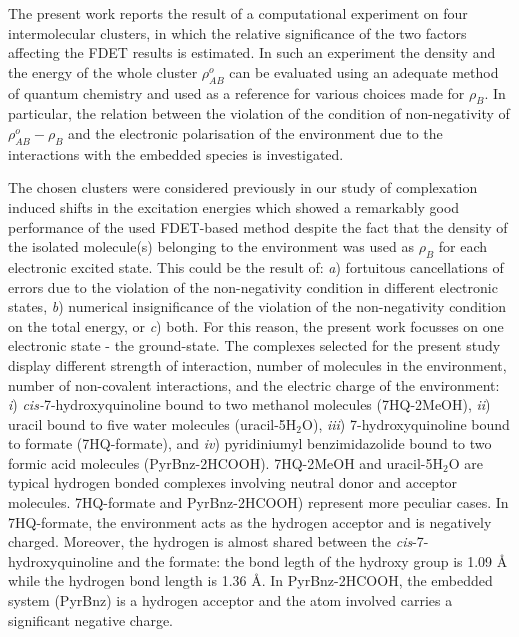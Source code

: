 \documentclass[journal=jctcce,manuscript=article]{achemso}
\newcommand{\nr}[1]{\color{red}#1\color{black}}
\begin{document}
The present work reports the result of a computational experiment on four intermolecular clusters, in which the relative significance 
of the two factors affecting the FDET results is \nr{estimated}. In such an experiment the density and the energy of the whole cluster \nr{$\rho_{AB}^o$ } can be evaluated using an adequate method of quantum chemistry and used as a reference for various choices made for $\rho_B$.
In particular, the relation between the violation of the condition of non-negativity of  \nr{$\rho_{AB}^o-\rho_B$ } and the electronic polarisation of the environment due to the interactions with the embedded species is investigated.


The chosen clusters were considered previously in our study of complexation induced shifts in the excitation energies \cite{Ricardi2018} which showed a remarkably good performance of the used FDET\nr{-}based method despite the fact that the density of the isolated molecule(s) belonging to the environment was used as $\rho_B$  for each electronic excited state. This could be the result of: {\it a})  fortuitous cancellations of errors due to the violation of the non-negativity condition in different electronic states, {\it b}) numerical insignificance of the violation of the non-negativity condition on the total energy, or {\it c}) both. 
For this reason, the present work focusses on one electronic state - the ground-state.
The complexes selected for the present study  display different strength of interaction, number of molecules in the environment, number of non-covalent interactions, and the electric charge of the environment:
{\it i})  \nr{\textit{cis-}}7-hydroxyquinoline bound to two methanol molecules (7HQ-2MeOH), {\it ii}) uracil bound to five water molecules (uracil-5H$_2$O), {\it iii}) 7-hydroxyquinoline bound to formate (7HQ-formate), and {\it iv}) \nr{pyridiniumyl } benzimidazolide bound to two formic acid molecules (PyrBnz-2HCOOH). 
7HQ-2MeOH and  uracil-5H$_2$O are typical hydrogen bonded complexes involving neutral donor and acceptor molecules. 7HQ-formate and PyrBnz-2HCOOH) represent more peculiar cases. In 7HQ-formate, the environment acts as the hydrogen acceptor and is negatively charged. Moreover, \nr{the hydrogen is almost shared between the \textit{cis}-7-hydroxyquinoline and the formate: the bond legth of the hydroxy group is 1.09 {\AA} while the hydrogen bond length is 1.36 {\AA}. }
In PyrBnz-2HCOOH, the embedded system (PyrBnz) is a hydrogen acceptor and the atom involved carries a significant negative charge.
\end{document}
